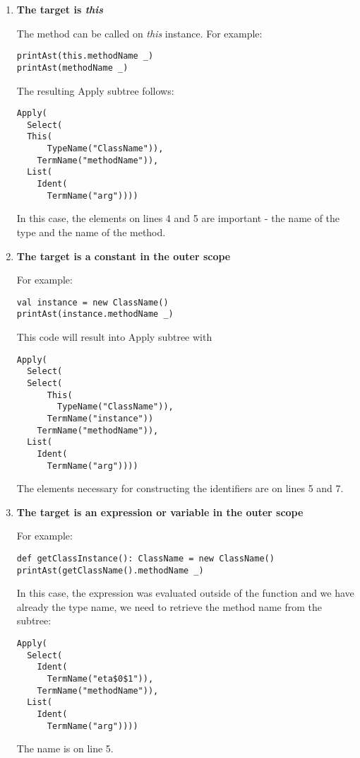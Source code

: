 \begin{enumerate}
\item \textbf{The target is \textit{this}}

The method can be called on \textit{this} instance. For example:

\lstset{style=Scala}
\begin{lstlisting}
printAst(this.methodName _)
printAst(methodName _)
\end{lstlisting}

The resulting Apply subtree follows:

\begin{lstlisting}
Apply(
  Select(
  This(
      TypeName("ClassName")), 
    TermName("methodName")),
  List(
    Ident(
      TermName("arg"))))
\end{lstlisting}

In this case, the elements on lines 4 and 5 are important - the name of the type and the name of the method.

\item \textbf{The target is a constant in the outer scope}

For example:

\lstset{style=Scala}
\begin{lstlisting}
val instance = new ClassName()
printAst(instance.methodName _)
\end{lstlisting}

This code will result into Apply subtree with 

\begin{lstlisting}
Apply(
  Select(
  Select(
      This(
        TypeName("ClassName")),
      TermName("instance"))
    TermName("methodName")),
  List(
    Ident(
      TermName("arg"))))
\end{lstlisting}

The elements necessary for constructing the identifiers are on lines 5 and 7.

\item \textbf{The target is an expression or variable in the outer scope}

For example:

\lstset{style=Scala}
\begin{lstlisting}
def getClassInstance(): ClassName = new ClassName()
printAst(getClassName().methodName _)
\end{lstlisting}

In this case, the expression was evaluated outside of the function and we have already the type name, we need to retrieve the method name from the subtree:

\begin{lstlisting}
Apply(
  Select(
    Ident(
      TermName("eta$0$1")), 
    TermName("methodName")), 
  List(
    Ident(
      TermName("arg"))))
\end{lstlisting}

The name is on line 5.

\end{enumerate}

